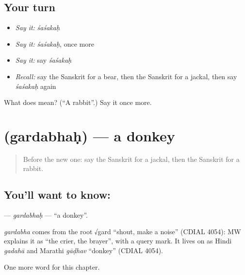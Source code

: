 \subsection*{Your turn}
\begin{itemize}
\raggedright
  \item \emph{Say it:} \emph{śaśakaḥ}
  \item \emph{Say it:} \emph{śaśakaḥ}, once more
  \item \emph{Say it:} say \emph{śaśakaḥ}
  \item \emph{Recall:} say the Sanskrit for a bear, then the Sanskrit for a jackal, then say \emph{śaśakaḥ} again
\end{itemize}

\begin{tcolorbox}[breakable,colback=teal!4,colframe=teal!35!black,title={Before you move on}]
What does  mean? (\textquotedblleft{}A rabbit\textquotedblright{}.) Say it once more.
\end{tcolorbox}
\section[\texorpdfstring{\sk{गर्दभः} (gardabhaḥ)}{गर्दभः (gardabhaḥ)}]{ (gardabhaḥ) — a donkey}

\label{lesson:SA-C113-gardabhah}



\begin{quote}
Before the new one: say the Sanskrit for a jackal, then the Sanskrit for a rabbit.
\end{quote}

\subsection*{You'll want to know: }
\textbf{} — \emph{gardabhaḥ} — \textquotedblleft{}a donkey\textquotedblright{}.

\begin{cousinweb}
\emph{gardabha} comes from the root √gard \textquotedblleft{}shout, make a noise\textquotedblright{} (CDIAL 4054): MW explains it as \textquotedblleft{}the crier, the brayer\textquotedblright{}, with a query mark. It lives on as Hindi \emph{gadahā} and Marathi \emph{gāḍhav} \textquotedblleft{}donkey\textquotedblright{} (CDIAL 4054).
\end{cousinweb}

\begin{grammarlens}[title={What you've built}]
One more word for this chapter.
\end{grammarlens}

